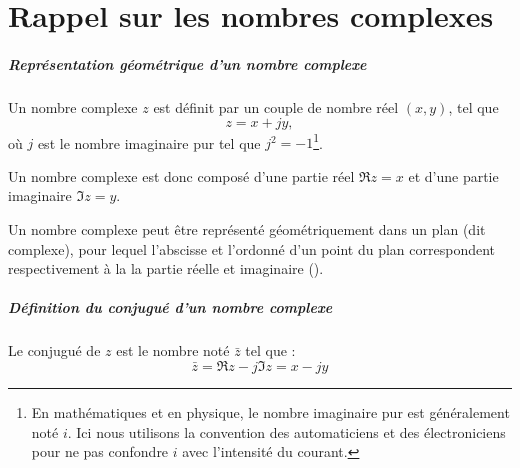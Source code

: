 \chapter{Rappel sur les nombres complexes\label{annexe-NC}}

\paragraph[Représentation d'un nombre complexe]
          {Représentation géométrique d'un nombre complexe}

Un nombre complexe $z$ est définit par un couple 
de nombre réel $(x,y)$, tel que 
$$
z=x+jy,
$$
où $j$ est le nombre imaginaire pur tel que $j^2=-1$\footnote{En mathématiques 
et en physique, le nombre imaginaire pur est généralement noté $i$. Ici nous 
utilisons la convention des automaticiens et des électroniciens pour ne
pas confondre $i$ avec l'intensité du courant.}.

Un nombre complexe est donc composé d'une partie 
réel $\Re{z}=x$ et d'une partie imaginaire $\Im{z}=y$.

Un nombre complexe peut être représenté géométriquement dans un plan 
(dit complexe), pour lequel l'abscisse et l'ordonné d'un 
point du plan correspondent respectivement 
à la la partie réelle et imaginaire ().
\paragraph{Définition du conjugué d'un nombre complexe}
Le conjugué de $z$ est le nombre noté $\bar{z}$ tel que :
$$
\bar{z}=\Re{z}-j\Im{z}=x-jy
$$

